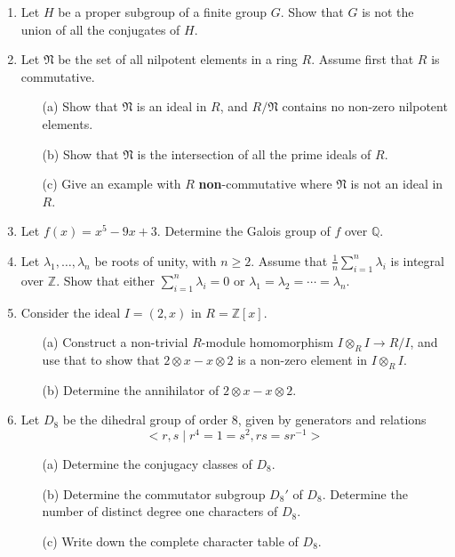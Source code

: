 \documentclass{article}
\begin{document}
\begin{enumerate}
    \item Let \(H\) be a proper subgroup of a finite group \(G\). Show that \(G\) is not the union of all the conjugates of \(H\).

    \item Let \(\mathfrak{N}\) be the set of all nilpotent elements in a ring \(R\). Assume first that \(R\) is commutative.
    \begin{itemize}
        \item[(a)] Show that \(\mathfrak{N}\) is an ideal in \(R\), and \(R/\mathfrak{N}\) contains no non-zero nilpotent elements.
        \item[(b)] Show that \(\mathfrak{N}\) is the intersection of all the prime ideals of \(R\).
        \item[(c)] Give an example with \(R\) \textbf{non}-commutative where \(\mathfrak{N}\) is not an ideal in \(R\).
    \end{itemize}

    \item Let \(f(x) = x^5 - 9x + 3\). Determine the Galois group of \(f\) over \(\mathbb{Q}\).

    \item Let \(\lambda_1, \ldots, \lambda_n\) be roots of unity, with \(n \geq 2\). Assume that \(\frac{1}{n} \sum_{i=1}^n \lambda_i\) is integral over \(\mathbb{Z}\). Show that either \(\sum_{i=1}^n \lambda_i = 0\) or \(\lambda_1 = \lambda_2 = \cdots = \lambda_n\).

    \item Consider the ideal \(I = (2,x)\) in \(R = \mathbb{Z}[x]\).
    \begin{itemize}
        \item[(a)] Construct a non-trivial \(R\)-module homomorphism \(I \otimes_R I \to R/I\), and use that to show that \(2 \otimes x - x \otimes 2\) is a non-zero element in \(I \otimes_R I\).
        \item[(b)] Determine the annihilator of \(2 \otimes x - x \otimes 2\).
    \end{itemize}

    \item Let \(D_8\) be the dihedral group of order 8, given by generators and relations
    \[< r, s \mid r^4 = 1 = s^2, rs = sr^{-1}>\]
    \begin{itemize}
        \item[(a)] Determine the conjugacy classes of \(D_8\).
        \item[(b)] Determine the commutator subgroup \(D_8'\) of \(D_8\). Determine the number of distinct degree one characters of \(D_8\).
        \item[(c)] Write down the complete character table of \(D_8\).
    \end{itemize}
\end{enumerate}
\end{document}
